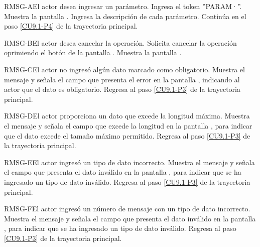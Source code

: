 	\begin{UCtrayectoriaA}{RMSG-A}{El actor desea ingresar un parámetro.}
		\UCpaso[\UCactor] Ingresa el token ''PARAM·''.
		\UCpaso[\UCsist] Muestra la pantalla .
		\UCpaso[\UCactor] Ingresa la descripción de cada parámetro.
		\UCpaso[\UCsist] Continúa en el paso \ref{CU9.1-P4} de la trayectoria principal.
	\end{UCtrayectoriaA}


	\begin{UCtrayectoriaA}{RMSG-B}{El actor desea cancelar la operación.}
		\UCpaso[\UCactor] Solicita cancelar la operación oprimiendo el botón  de la pantalla .
		\UCpaso[\UCsist] Muestra la pantalla .
	\end{UCtrayectoriaA}

	\begin{UCtrayectoriaA}{RMSG-C}{El actor no ingresó algún dato marcado como obligatorio.}
		\UCpaso[\UCsist] Muestra el mensaje  y señala el campo que presenta el error en la pantalla , indicando al actor que el dato es obligatorio.
		\UCpaso Regresa al paso \ref{CU9.1-P3} de la trayectoria principal.
	\end{UCtrayectoriaA}

	\begin{UCtrayectoriaA}{RMSG-D}{El actor proporciona un dato que excede la longitud máxima.}
		\UCpaso[\UCsist] Muestra el mensaje  y señala el campo que excede la longitud en la pantalla , para indicar que el dato excede el tamaño máximo permitido.
		\UCpaso Regresa al paso \ref{CU9.1-P3} de la trayectoria principal.
	\end{UCtrayectoriaA}

	\begin{UCtrayectoriaA}{RMSG-E}{El actor ingresó un tipo de dato incorrecto.}
		\UCpaso[\UCsist] Muestra el mensaje  y señala el campo que presenta el dato inválido en la pantalla , para indicar que se ha ingresado un tipo de dato inválido.
		\UCpaso Regresa al paso \ref{CU9.1-P3} de la trayectoria principal.
	\end{UCtrayectoriaA}

	\begin{UCtrayectoriaA}{RMSG-F}{El actor ingresó un número de mensaje con un tipo de dato incorrecto.}
		\UCpaso[\UCsist] Muestra el mensaje  y señala el campo que presenta el dato inválido en la pantalla , para indicar que se ha ingresado un tipo de dato inválido.
		\UCpaso Regresa al paso \ref{CU9.1-P3} de la trayectoria principal.
	\end{UCtrayectoriaA}

